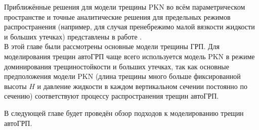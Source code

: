 Приближённые решения для модели трещины PKN во всём параметрическом пространстве и точные аналитические решения для предельных режимов распространения (например, для случая пренебрежимо малой вязкости жидкости и больших утечках) представлены в работе \cite{dontsov2021analysis}.\\

В этой главе были рассмотрены основные модели трещины ГРП.
Для моделирования трещин автоГРП \cite{kalinin} чаще всего используется модель PKN в режиме доминирования трещиностойкости и больших утечках, так как основные предположения модели PKN (длина трещины много больше фиксированной высоты $H$ и давление жидкости в каждом вертикальном сечении постоянно по сечению) соответствуют процессу распространения трещин автоГРП.

В следующей главе будет проведён обзор подходов к моделированию трещин автоГРП.









